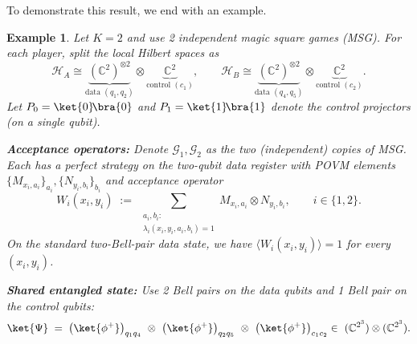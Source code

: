 \documentclass{article}
\newtheorem{example}{Example}
\begin{document}
To demonstrate this result, we end with an example. 
\begin{example}\label{ex: compressed}
    Let $K=2$ and use 2 independent magic square games (MSG). For each player, split the local Hilbert spaces as 
    \begin{equation}
        \mathcal H_A \cong \underbrace{(\mathbb C^2)^{\otimes 2}}_{\text{data }(q_1,q_2)} \otimes \underbrace{\mathbb C^2}_{\text{control }(c_1)},  \qquad \mathcal H_B \cong \underbrace{(\mathbb C^2)^{\otimes 2}}_{\text{data }(q_4,q_5)} \otimes \underbrace{\mathbb C^2}_{\text{control }(c_2)}.
    \end{equation}
    Let $P_0=\ket{0}\!\bra{0}$ and $P_1=\ket{1}\!\bra{1}$ denote the control projectors (on a single qubit).
    
    \textbf{Acceptance operators:}
    Denote $\mathcal G_1,\mathcal G_2$ as the two (independent) copies of MSG. Each has a perfect strategy on the two-qubit \emph{data} register with POVM elements $\{M_{x_i,a_i}\}_{a_i}, \{N_{y_i,b_i}\}_{b_i}$ and acceptance operator
    \begin{equation}
        W_i(x_i,y_i)\;:=\;\sum_{\substack{a_i,b_i:\\\lambda_i(x_i,y_i,a_i,b_i)=1}} M_{x_i,a_i}\otimes N_{y_i,b_i}, \qquad i\in\{1,2\}.
    \end{equation}
    On the standard two-Bell-pair data state, we have $\langle W_i(x_i,y_i)\rangle=1$ for every $(x_i,y_i)$.

    \textbf{Shared entangled state:} Use 2 Bell pairs on the data qubits and 1 Bell pair on the control qubits:
    \begin{equation}
        \ket{\Psi}\;=\;\big(\ket{\phi^+}\big)_{q_1 q_4}\ \otimes\ \big(\ket{\phi^+}\big)_{q_2 q_5}\ \otimes\ \big(\ket{\phi^+}\big)_{c_1c_2}  \in\ (\mathbb C^{2^3})\otimes(\mathbb C^{2^3}).
    \end{equation}


\end{example}
\end{document}
